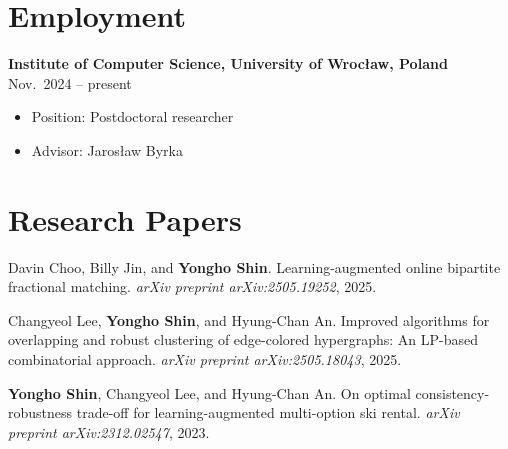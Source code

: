 \documentclass{article}
\newcommand{\killinitspace}{-0.7em}
\begin{document}
\section{Employment}
\textbf{Institute of Computer Science, University of Wrocław, Poland} \hfill Nov.~2024 -- present
\vspace{\killinitspace}
\begin{itemize}
\item Position: Postdoctoral researcher
\item Advisor: Jarosław Byrka
\end{itemize}

\section{Research Papers}
Davin Choo, Billy Jin, and \textbf{Yongho Shin}. Learning-augmented online bipartite fractional matching. \emph{arXiv preprint arXiv:2505.19252}, 2025.

Changyeol Lee, \textbf{Yongho Shin}, and Hyung-Chan An. Improved algorithms for overlapping and robust clustering of edge-colored hypergraphs: An LP-based combinatorial approach. \emph{arXiv preprint arXiv:2505.18043}, 2025.

\textbf{Yongho Shin}, Changyeol Lee, and Hyung-Chan An. On optimal consistency-robustness trade-off for learning-augmented multi-option ski rental. \emph{arXiv preprint arXiv:2312.02547}, 2023.
\end{document}
